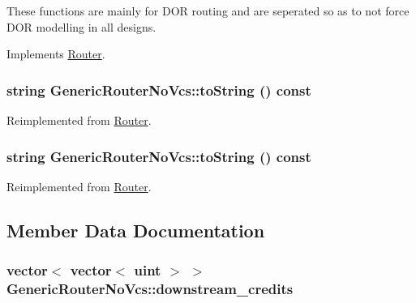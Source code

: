 These functions are mainly for DOR routing and are seperated so as to not force DOR modelling in all designs. 



Implements \hyperlink{classRouter_33073537e883e8bea1a25690bcb70049}{Router}.\hypertarget{classGenericRouterNoVcs_59307c319fbca5732d750630be9ee27c}{
\subsubsection[{toString}]{\setlength{\rightskip}{0pt plus 5cm}string GenericRouterNoVcs::toString () const}}
\label{classGenericRouterNoVcs_59307c319fbca5732d750630be9ee27c}




Reimplemented from \hyperlink{classRouter_1e749a51dcf6cbd6925ac677473c7f58}{Router}.\hypertarget{classGenericRouterNoVcs_59307c319fbca5732d750630be9ee27c}{
\subsubsection[{toString}]{\setlength{\rightskip}{0pt plus 5cm}string GenericRouterNoVcs::toString () const}}
\label{classGenericRouterNoVcs_59307c319fbca5732d750630be9ee27c}




Reimplemented from \hyperlink{classRouter_1e749a51dcf6cbd6925ac677473c7f58}{Router}.

\subsection{Member Data Documentation}
\hypertarget{classGenericRouterNoVcs_ee50aef2694512a3fdbceca9f5fe8b7e}{
\subsubsection[{downstream\_\-credits}]{\setlength{\rightskip}{0pt plus 5cm}vector$<$ vector$<$ {\bf uint} $>$ $>$ {\bf GenericRouterNoVcs::downstream\_\-credits}}}
\label{classGenericRouterNoVcs_ee50aef2694512a3fdbceca9f5fe8b7e}


